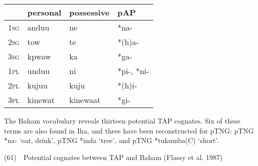 \begin{center}
\tablehead{}
\begin{supertabular}{|m{0.32265985in}|m{0.63655984in}|m{0.7754598in}|m{0.6920598in}|}
\hline
 &
personal &
possessive &
pAP\\\hline
\textsc{1sg} &
anduu &
ne &
*na-\\\hline
\textsc{2sg} &
tow &
te &
*(h)a-\\\hline
\textsc{3sg} &
kpwaw &
ka &
*ga-\\\hline
\textsc{1pl} &
unduu &
ni &
*pi-, *ni-\\\hline
\textsc{2pl} &
kujuu &
kuju &
*(h)i-\\\hline
\textsc{3pl} &
kinewat &
kinewaat &
*gi-\\\hline
\end{supertabular}
\end{center}
The Baham vocabulary reveals thirteen potential TAP cognates. Six of these terms are also found in Iha, and three have been reconstructed for pTNG: pTNG *na- {\textquoteleft}eat, drink{\textquoteright}, pTNG *inda {\textquoteleft}tree{\textquoteright}, and pTNG *tukumba(C) {\textquoteleft}short{\textquoteright}. 

(61)\ \ Potential cognates between TAP and Baham (Flassy et al. 1987)

